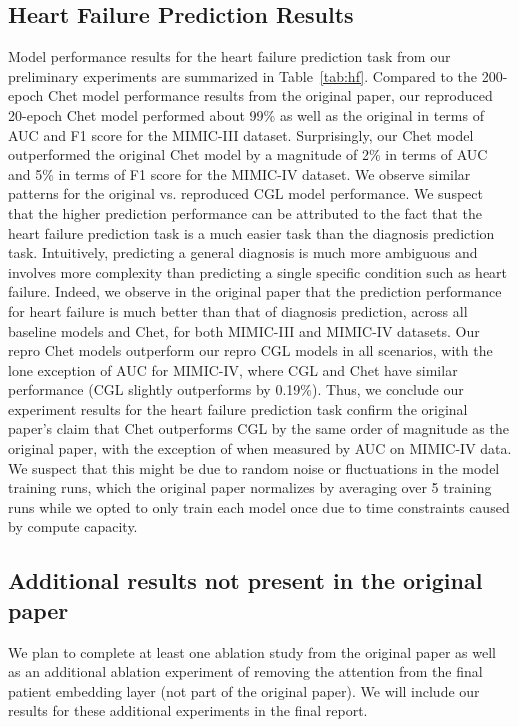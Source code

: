 \documentclass[11pt,a4paper,fleqn]{article}
\begin{document}
\subsection{Heart Failure Prediction Results}
Model performance results for the heart failure prediction task from our
preliminary experiments are summarized in Table~\ref{tab:hf}. Compared to the
200-epoch Chet model performance results from the original paper, our reproduced
20-epoch Chet model performed about 99\% as well as the original in terms of AUC
and F1 score for the MIMIC-III dataset. Surprisingly, our Chet model
outperformed the original Chet model by a magnitude of 2\% in terms of AUC and
5\% in terms of F1 score for the MIMIC-IV dataset. We observe similar patterns
for the original vs. reproduced CGL model performance. We suspect that the
higher prediction performance can be attributed to the fact that the heart
failure prediction task is a much easier task than the diagnosis prediction
task. Intuitively, predicting a general diagnosis is much more ambiguous and
involves more complexity than predicting a single specific condition such as
heart failure. Indeed, we observe in the original paper that the prediction
performance for heart failure is much better than that of diagnosis prediction,
across all baseline models and Chet, for both MIMIC-III and MIMIC-IV datasets.
Our repro Chet models outperform our repro CGL models in all scenarios, with the
lone exception of AUC for MIMIC-IV, where CGL and Chet have similar performance
(CGL slightly outperforms by 0.19\%). Thus, we conclude our experiment results
for the heart failure prediction task confirm the original paper's claim that
Chet outperforms CGL by the same order of magnitude as the original paper, with
the exception of when measured by AUC on MIMIC-IV data. We suspect that this
might be due to random noise or fluctuations in the model training runs, which
the original paper normalizes by averaging over 5 training runs while we opted to 
only train each model once due to time constraints caused by compute capacity.

\subsection{Additional results not present in the original paper}
We plan to complete at least one ablation study from the original paper as well
as an additional ablation experiment of removing the attention from the final
patient embedding layer (not part of the original paper). We will include our
results for these additional experiments in the final report.
\end{document}
